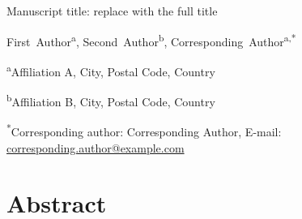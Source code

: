 \documentclass[12pt]{article}
\newcommand{\manuscripttitle}{Manuscript title: replace with the full title}
\begin{document}
\linenumbers

\begin{center}
{\LARGE{}\selectfont \manuscripttitle\par}
\end{center}

\vspace{0.8em}

\begingroup
\normalsize
{}
\noindent
\mbox{First~Author}\textsuperscript{a},
\mbox{Second~Author}\textsuperscript{b},
\mbox{Corresponding~Author}\textsuperscript{a,*}
\par
\vspace{0.7em}

\noindent
\textsuperscript{a}Affiliation A, City, Postal Code, Country
\par
\noindent
\textsuperscript{b}Affiliation B, City, Postal Code, Country
\par
\vspace{0.55em}

\noindent
\textsuperscript{*}Corresponding author:
Corresponding Author,
E-mail: \href{mailto:corresponding.author@example.com}
{corresponding.author@example.com}
\par
\endgroup

\vspace{1em}

\section*{Abstract}
\end{document}
